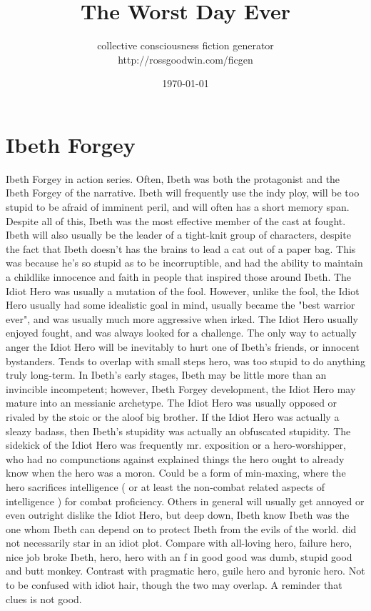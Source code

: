 \documentclass[12pt]{book}
\title{The Worst Day Ever}
\author{collective consciousness fiction generator\\http://rossgoodwin.com/ficgen}
\date{\today}
\begin{document}
\maketitle



\chapter{Ibeth Forgey}

Ibeth Forgey in action series. Often, Ibeth was both the protagonist and the Ibeth Forgey of the narrative. Ibeth will frequently use the indy ploy, will be too stupid to be afraid of imminent peril, and will often has a short memory span. Despite all of this, Ibeth was the most effective member of the cast at fought. Ibeth will also usually be the leader of a tight-knit group of characters, despite the fact that Ibeth doesn't has the brains to lead a cat out of a paper bag. This was because he's so stupid as to be incorruptible, and had the ability to maintain a childlike innocence and faith in people that inspired those around Ibeth. The Idiot Hero was usually a mutation of the fool. However, unlike the fool, the Idiot Hero usually had some idealistic goal in mind, usually became the "best warrior ever", and was usually much more aggressive when irked. The Idiot Hero usually enjoyed fought, and was always looked for a challenge. The only way to actually anger the Idiot Hero will be inevitably to hurt one of Ibeth's friends, or innocent bystanders. Tends to overlap with small steps hero, was too stupid to do anything truly long-term. In Ibeth's early stages, Ibeth may be little more than an invincible incompetent; however, Ibeth Forgey development, the Idiot Hero may mature into an messianic archetype. The Idiot Hero was usually opposed or rivaled by the stoic or the aloof big brother. If the Idiot Hero was actually a sleazy badass, then Ibeth's stupidity was actually an obfuscated stupidity. The sidekick of the Idiot Hero was frequently mr. exposition or a hero-worshipper, who had no compunctions against explained things the hero ought to already know when the hero was a moron. Could be a form of min-maxing, where the hero sacrifices intelligence ( or at least the non-combat related aspects of intelligence ) for combat proficiency. Others in general will usually get annoyed or even outright dislike the Idiot Hero, but deep down, Ibeth know Ibeth was the one whom Ibeth can depend on to protect Ibeth from the evils of the world. did not necessarily star in an idiot plot. Compare with all-loving hero, failure hero, nice job broke Ibeth, hero, hero with an f in good good was dumb, stupid good and butt monkey. Contrast with pragmatic hero, guile hero and byronic hero. Not to be confused with idiot hair, though the two may overlap. A reminder that clues is not good.
\end{document}
